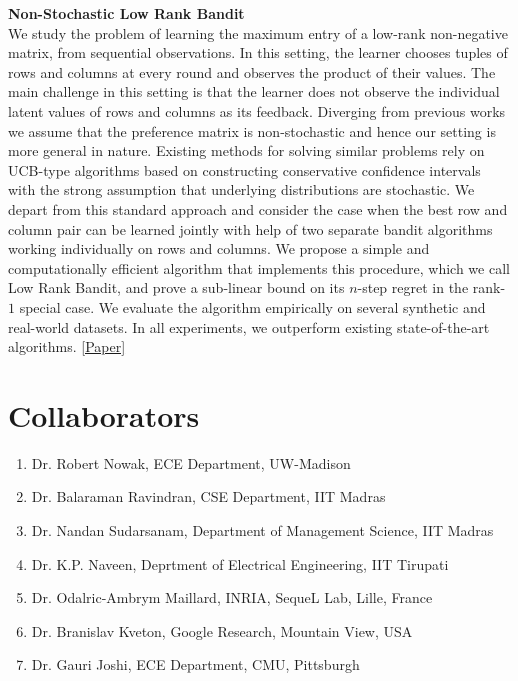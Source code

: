 \documentclass[margin,11pt]{res}
\begin{document}
\begin{resume}
\textbf{Non-Stochastic Low Rank Bandit}\\
We study the problem of learning the maximum entry of a low-rank non-negative matrix, from sequential observations. In this setting, the learner chooses tuples of rows and columns at every round and observes the product of their values. The main challenge in this setting is that the learner does not observe the individual latent values of rows and columns as its feedback. Diverging from previous works we assume that the preference matrix is non-stochastic and hence our setting is more general in nature. Existing methods for solving similar problems rely on UCB-type algorithms based on constructing conservative confidence intervals with the strong assumption that underlying distributions are stochastic. We depart from this standard approach and consider the case when the best row and column pair can be learned jointly with help of two separate bandit algorithms working individually on rows and columns. We propose a simple and computationally efficient algorithm that implements this procedure, which we call Low Rank Bandit, and prove a sub-linear bound on its $n$-step regret in the rank-$1$ special case. We evaluate the algorithm empirically on several synthetic and real-world datasets. In all experiments, we outperform existing state-of-the-art algorithms. \href{https://github.com/Subhojyoti/Latent_Bandits/blob/master/IJCAI2019/bandit_paper.pdf}{[Paper]}


\section{Collaborators}
\begin{enumerate}
\item Dr. Robert Nowak, ECE Department, UW-Madison
\item Dr. Balaraman Ravindran, CSE Department, IIT Madras
\item Dr. Nandan Sudarsanam, Department of Management Science, IIT Madras
\item Dr. K.P. Naveen, Deprtment of Electrical Engineering, IIT Tirupati
\item Dr. Odalric-Ambrym Maillard, INRIA, SequeL Lab, Lille, France
\item Dr. Branislav Kveton, Google Research, Mountain View, USA
\item Dr. Gauri Joshi, ECE Department, CMU, Pittsburgh
\end{enumerate}


\end{resume}
\end{document}
